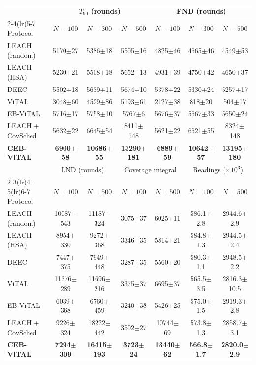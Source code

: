 \begin{tabular}{lcccccc}
\toprule
 & \multicolumn{3}{c}{$T_{90}$ (rounds)} & \multicolumn{3}{c}{FND (rounds)} \\
\cmidrule(lr){2-4}\cmidrule(lr){5-7}
Protocol & $N{=}100$ & $N{=}300$ & $N{=}500$ & $N{=}100$ & $N{=}300$ & $N{=}500$ \\
\midrule
LEACH (random) & 5170$\pm$27 & 5386$\pm$18 & 5505$\pm$16 & 4825$\pm$46 & 4665$\pm$46 & 4549$\pm$53 \\
LEACH (HSA) & 5230$\pm$21 & 5508$\pm$18 & 5652$\pm$13 & 4931$\pm$39 & 4750$\pm$42 & 4650$\pm$37 \\
DEEC & 5502$\pm$18 & 5639$\pm$11 & 5674$\pm$10 & 5378$\pm$22 & 5330$\pm$24 & 5257$\pm$17 \\
ViTAL & 3048$\pm$60 & 4529$\pm$86 & 5193$\pm$61 & 2127$\pm$38 & 818$\pm$20 & 504$\pm$17 \\
EB-ViTAL & 5716$\pm$17 & 5758$\pm$10 & 5767$\pm$6 & 5676$\pm$37 & 5667$\pm$33 & 5650$\pm$24 \\
LEACH + CovSched & 5632$\pm$22 & 6645$\pm$54 & 8411$\pm$148 & 5621$\pm$22 & 6621$\pm$55 & 8324$\pm$148 \\
\textbf{CEB-ViTAL} & \textbf{6900$\pm$58} & \textbf{10686$\pm$55} & \textbf{13290$\pm$181} & \textbf{6889$\pm$59} & \textbf{10642$\pm$57} & \textbf{13195$\pm$180} \\
\midrule
 & \multicolumn{2}{c}{LND (rounds)} & \multicolumn{2}{c}{Coverage integral} & \multicolumn{2}{c}{Readings ($\times10^3$)} \\
\cmidrule(lr){2-3}\cmidrule(lr){4-5}\cmidrule(lr){6-7}
Protocol & $N{=}100$ & $N{=}500$ & $N{=}100$ & $N{=}500$ & $N{=}100$ & $N{=}500$ \\
\midrule
LEACH (random) & 10087$\pm$543 & 11187$\pm$324 & 3075$\pm$37 & 6025$\pm$11 & 586.1$\pm$2.8 & 2944.6$\pm$2.9 \\
LEACH (HSA) & 8954$\pm$330 & 9272$\pm$368 & 3346$\pm$35 & 5814$\pm$21 & 584.8$\pm$1.3 & 2944.5$\pm$2.4 \\
DEEC & 7447$\pm$375 & 7949$\pm$448 & 3287$\pm$35 & 5560$\pm$20 & 580.3$\pm$1.1 & 2948.5$\pm$2.2 \\
ViTAL & 11376$\pm$289 & 11696$\pm$216 & 3375$\pm$37 & 6695$\pm$37 & 565.5$\pm$3.5 & 2816.3$\pm$10.5 \\
EB-ViTAL & 6039$\pm$368 & 6760$\pm$459 & 3240$\pm$38 & 5426$\pm$25 & 575.0$\pm$1.5 & 2919.3$\pm$2.8 \\
LEACH + CovSched & 9226$\pm$324 & 18222$\pm$442 & 3502$\pm$27 & 10744$\pm$69 & 573.8$\pm$1.3 & 2858.7$\pm$3.1 \\
\textbf{CEB-ViTAL} & \textbf{7294$\pm$309} & \textbf{16415$\pm$193} & \textbf{3723$\pm$24} & \textbf{13440$\pm$62} & \textbf{566.8$\pm$1.7} & \textbf{2820.0$\pm$2.9} \\
\bottomrule
\end{tabular}
